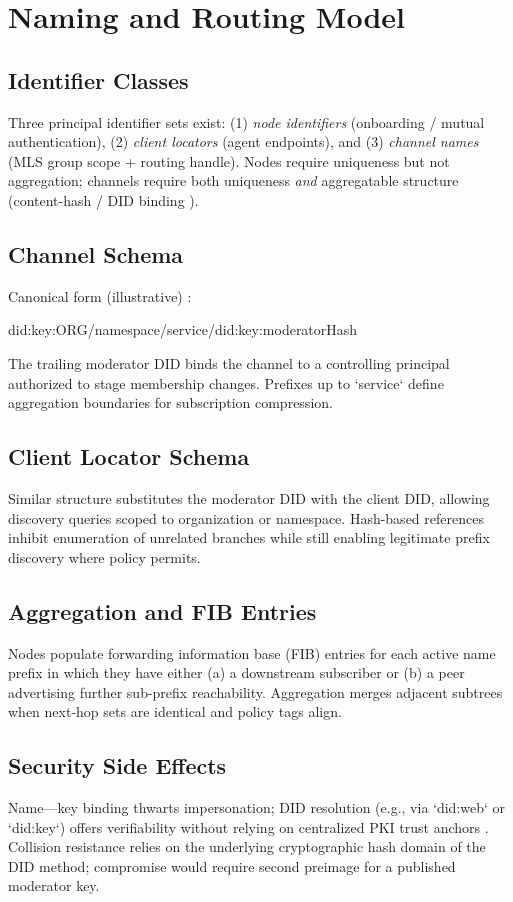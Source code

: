 \documentclass{article}
\theoremstyle{definition}
\theoremstyle{remark}
\begin{document}
\section{Naming and Routing Model}\label{sec:naming}
\subsection{Identifier Classes}
Three principal identifier sets exist: (1) \emph{node identifiers} (onboarding / mutual authentication), (2) \emph{client locators} (agent endpoints), and (3) \emph{channel names} (MLS group scope + routing handle). Nodes require uniqueness but not aggregation; channels require both uniqueness \emph{and} aggregatable structure (content-hash / DID binding \citep{rfc6920,didcore}).
\subsection{Channel Schema}
Canonical form (illustrative) \citep{didcore,didkey}:
\begin{center}\ttfamily did:key:ORG/namespace/service/did:key:moderatorHash\end{center}
The trailing moderator DID binds the channel to a controlling principal authorized to stage membership changes. Prefixes up to `service` define aggregation boundaries for subscription compression.
\subsection{Client Locator Schema}
Similar structure substitutes the moderator DID with the client DID, allowing discovery queries scoped to organization or namespace. Hash-based references inhibit enumeration of unrelated branches while still enabling legitimate prefix discovery where policy permits.
\subsection{Aggregation and FIB Entries}
Nodes populate forwarding information base (FIB) entries for each active name prefix in which they have either (a) a downstream subscriber or (b) a peer advertising further sub-prefix reachability. Aggregation merges adjacent subtrees when next-hop sets are identical and policy tags align.
\subsection{Security Side Effects}
Name---key binding thwarts impersonation; DID resolution (e.g., via `did:web` or `did:key`) offers verifiability without relying on centralized PKI trust anchors \citep{didweb,didkey}. Collision resistance relies on the underlying cryptographic hash domain of the DID method; compromise would require second preimage for a published moderator key.
\end{document}

